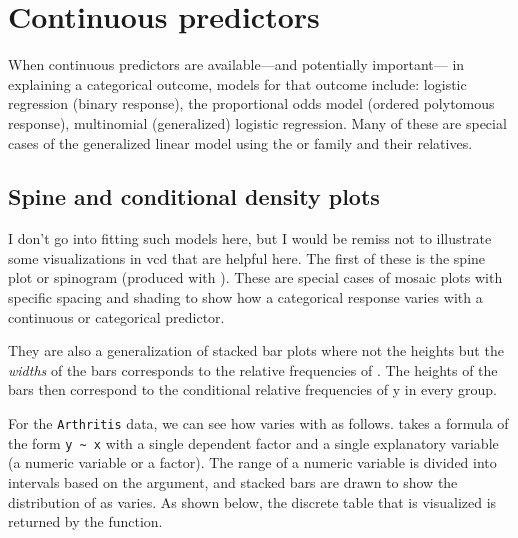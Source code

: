 \documentclass[10pt,twoside]{article}\usepackage[]{graphicx}\usepackage[]{color}
\newcommand*{\Example}{\fbox{\textbf{\emph{Example}}:} }
\newcommand{\data}[1]{\texttt{#1}}
\newcommand{\codefun}[1]{\code{#1()}}
\newcommand{\pkg}[1]{{\normalfont\fontseries{b}\selectfont #1}}
\begin{document}



\section[Continuous predictors]{Continuous predictors}\label{sec:contin}
When continuous predictors are available---and potentially important--- in explaining a
categorical outcome, models for that outcome include:
logistic regression (binary response), 
the proportional odds model (ordered polytomous response),
multinomial (generalized) logistic regression.
Many of these are special cases of the generalized linear model using the
 or  family and their relatives.

\subsection{Spine and conditional density plots}\label{sec:spine}
I don't go into fitting such models here, but I would be remiss not to illustrate some
visualizations in \pkg{vcd} that are helpful here.
The first of these is the spine plot or spinogram \citep{vcd:Hummel:1996}
 (produced with \codefun{spine}).
These are special cases of mosaic plots with 
specific spacing and shading to show how a categorical response varies with
a continuous or categorical predictor.

They are also a generalization of stacked bar plots where not the heights  but
the \emph{widths} of the bars corresponds to the relative frequencies of . The heights
of the  bars then  correspond to  the conditional  relative frequencies  of {y} in
every  group.

\Example
For the \data{Arthritis} data, we can see how  varies with 
as follows.  \codefun{spine} takes a formula of the form 
\verb|y ~ x| with a single dependent factor and a single explanatory variable 
(a numeric variable or a factor).
The range of a numeric variable is divided into intervals based on the
 argument, and stacked bars are drawn to show the distribution of
 as  varies.  As shown below, the discrete table that is visualized
is returned by the function.
\end{document}
